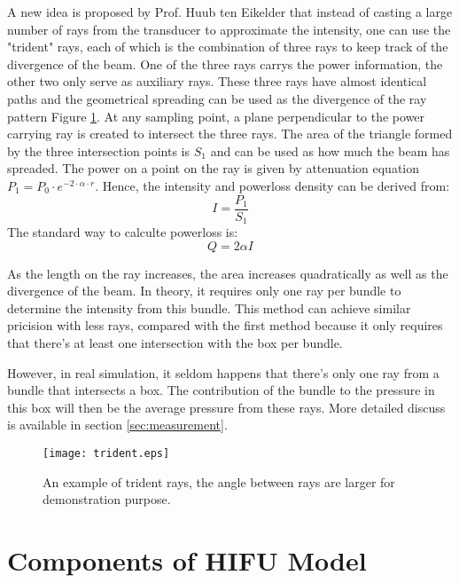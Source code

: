 A new idea is proposed by Prof. Huub ten Eikelder that instead of casting a large number of rays from the transducer to approximate the intensity, one can use the "trident" rays, each of which is the combination of three rays to keep track of the divergence of the beam. One of the three rays carrys the power information, the other two only serve as auxiliary rays. These three rays have almost identical paths and the geometrical spreading can be used as the divergence of the ray pattern Figure \ref{fig:Trident_ray}. At any sampling point, a plane perpendicular to the power carrying ray is created to intersect the three rays. The area of the triangle formed by the three intersection points is $S_1$ and can be used as how much the beam has spreaded. The power on a point on the ray is given by attenuation equation $P_1=P_0\cdot e^{-2\cdot \alpha \cdot r}$. Hence, the intensity and powerloss density can be derived from:
\begin{equation}
    I=\frac{P_1}{S_1}
\end{equation}
The standard way to calculte powerloss is:
\begin{equation}
    Q=2\alpha I
\end{equation}

As the length on the ray increases, the area increases quadratically as well as the divergence of the beam. In theory, it requires only one ray per bundle to determine the intensity from this bundle. This method can achieve similar pricision with less rays, compared with the first method because it only requires that there's at least one intersection with the box per bundle.

However, in real simulation, it seldom happens that there's only one ray from a bundle that intersects a box. The contribution of the bundle to the pressure in this box will then be the average pressure from these rays. More detailed discuss is available in section \ref{sec:measurement}.

\begin{figure}[h]
    \centering
    \texttt{[image: trident.eps]}
    \caption{An example of trident rays, the angle between rays are larger for demonstration purpose.}
    \label{fig:Trident_ray}
\end{figure}

\section{Components of HIFU Model} \label{sec:components}

